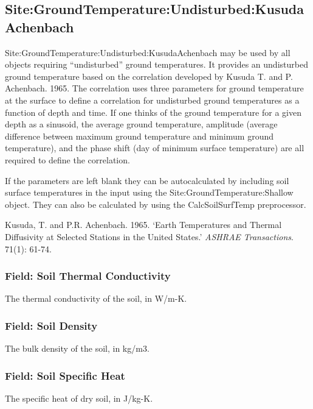 \subsection{Site:GroundTemperature:Undisturbed:KusudaAchenbach}\label{sitegroundtemperatureundisturbedkusudaachenbach}

Site:GroundTemperature:Undisturbed:KusudaAchenbach may be used by all objects requiring ``undisturbed'' ground temperatures. It provides an undisturbed ground temperature based on the correlation developed by Kusuda T. and P. Achenbach. 1965. The correlation uses three parameters for ground temperature at the surface to define a correlation for undisturbed ground temperatures as a function of depth and time. If one thinks of the ground temperature for a given depth as a sinusoid, the average ground temperature, amplitude (average difference between maximum ground temperature and minimum ground temperature), and the phase shift (day of minimum surface temperature) are all required to define the correlation.

If the parameters are left blank they can be autocalculated by including soil surface temperatures in the input using the Site:GroundTemperature:Shallow object. They can also be calculated by using the CalcSoilSurfTemp preprocessor.

Kusuda, T. and P.R. Achenbach. 1965. `Earth Temperatures and Thermal Diffusivity at Selected Stations in the United States.' \emph{ASHRAE Transactions}. 71(1): 61-74.

\subsubsection{Field: Soil Thermal Conductivity}\label{field-soil-thermal-conductivity-1}

The thermal conductivity of the soil, in W/m-K.

\subsubsection{Field: Soil Density}\label{field-soil-density-1}

The bulk density of the soil, in kg/m3.

\subsubsection{Field: Soil Specific Heat}\label{field-soil-specific-heat-1}

The specific heat of dry soil, in J/kg-K.

